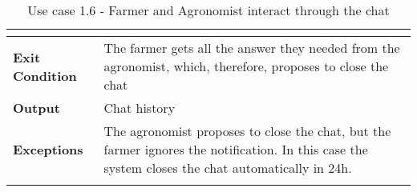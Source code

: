 \begin{longtable}[H]{ | l | p{10cm} | }
\begin{itemize}
\end{itemize}
\\ \hline
{\cellcolor[rgb]{0.753,0.753,0.753}}\textbf{Exit Condition} & The farmer gets all the answer they needed from the agronomist, which, therefore, proposes to close the chat\\ \hline
{\cellcolor[rgb]{0.753,0.753,0.753}}\textbf{Output} & 
Chat history
\\ \hline
{\cellcolor[rgb]{0.753,0.753,0.753}}\textbf{Exceptions} & 
The agronomist proposes to close the chat, but the farmer ignores the notification. In this case the system closes the chat automatically in 24h. 
\\ \hline
\caption{Use case 1.6 - Farmer and Agronomist interact through the chat}
\\
\end{longtable}